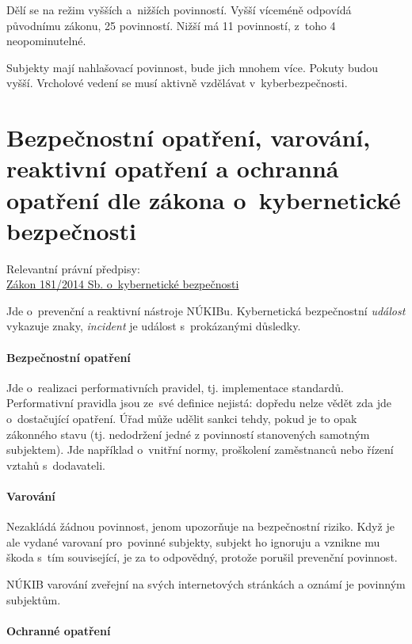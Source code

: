 Dělí se na režim vyšších a~nižších povinností. Vyšší víceméně odpovídá původnímu zákonu, 25 povinností. Nižší má 11 povinností, z~toho 4 neopominutelné.

Subjekty mají nahlašovací povinnost, bude jich mnohem více. Pokuty budou vyšší. Vrcholové vedení se musí aktivně vzdělávat v~kyberbezpečnosti.

\clearpage
\section{Bezpečnostní opatření, varování, reaktivní opatření a ochranná opatření dle zákona o~kybernetické bezpečnosti}

{}Relevantní právní předpisy:
\\\href{https://www.zakonyprolidi.cz/cs/2014-181}{Zákon 181/2014 Sb. o~kybernetické bezpečnosti}

Jde o~prevenční a reaktivní nástroje NÚKIBu.
Kybernetická bezpečnostní \emph{událost} vykazuje znaky, \emph{incident} je událost s~prokázanými důsledky.

\paragraph{Bezpečnostní opatření}

Jde o~realizaci performativních pravidel, tj. implementace standardů.
Performativní pravidla jsou ze~své definice nejistá: dopředu nelze vědět zda jde o~dostačující opatření.
Úřad může udělit sankci tehdy, pokud je to opak zákonného stavu (tj. nedodržení jedné z povinností stanovených samotným subjektem).
Jde například o~vnitřní normy, proškolení zaměstnanců nebo řízení vztahů s~dodavateli.

\paragraph{Varování}

Nezakládá žádnou povinnost, jenom upozorňuje na bezpečnostní riziko.
Když je ale vydané varovaní pro~povinné subjekty, subjekt ho ignoruju a vznikne mu škoda s~tím související, je za to odpovědný, protože porušil prevenční povinnost.

NÚKIB varování zveřejní na svých internetových stránkách a oznámí je povinným subjektům.

\paragraph{Ochranné opatření}

